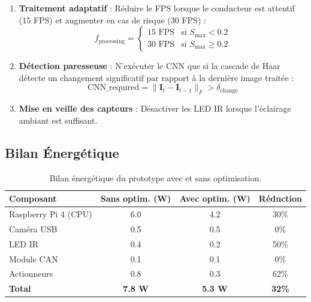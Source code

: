 \begin{enumerate}[leftmargin=2cm]
    \item \textbf{Traitement adaptatif} : Réduire le FPS lorsque le conducteur est attentif (15 FPS) et augmenter en cas de risque (30 FPS) :
    \begin{equation}
    f_{\text{processing}} = \begin{cases}
        15 \text{ FPS} & \text{si } S_{\max} < 0.2 \\
        30 \text{ FPS} & \text{si } S_{\max} \geq 0.2
    \end{cases}
    \label{eq:adaptive_fps}
    \end{equation}
    
    \item \textbf{Détection paresseuse} : N'exécuter le CNN que si la cascade de Haar détecte un changement significatif par rapport à la dernière image traitée :
    \begin{equation}
    \text{CNN\_required} = \|\mathbf{I}_t - \mathbf{I}_{t-1}\|_F > \delta_{\text{change}}
    \label{eq:lazy_detection}
    \end{equation}
    
    \item \textbf{Mise en veille des capteurs} : Désactiver les LED IR lorsque l'éclairage ambiant est suffisant.
\end{enumerate}

\subsection{Bilan Énergétique}

\begin{table}[H]
\centering
\caption{Bilan énergétique du prototype avec et sans optimisation.}
\label{tab:energy_budget}
\renewcommand{\arraystretch}{1.3}
\begin{tabular}{|l|c|c|c|}
\hline
\rowcolor{stellantisblue!15}
\textbf{Composant} & \textbf{Sans optim. (W)} & \textbf{Avec optim. (W)} & \textbf{Réduction} \\
\hline
Raspberry Pi 4 (CPU) & 6.0 & 4.2 & 30\% \\
\hline
Caméra USB & 0.5 & 0.5 & 0\% \\
\hline
LED IR & 0.4 & 0.2 & 50\% \\
\hline
Module CAN & 0.1 & 0.1 & 0\% \\
\hline
Actionneurs & 0.8 & 0.3 & 62\% \\
\hline
\textbf{Total} & \textbf{7.8 W} & \textbf{5.3 W} & \textbf{32\%} \\
\hline
\end{tabular}
\end{table}

